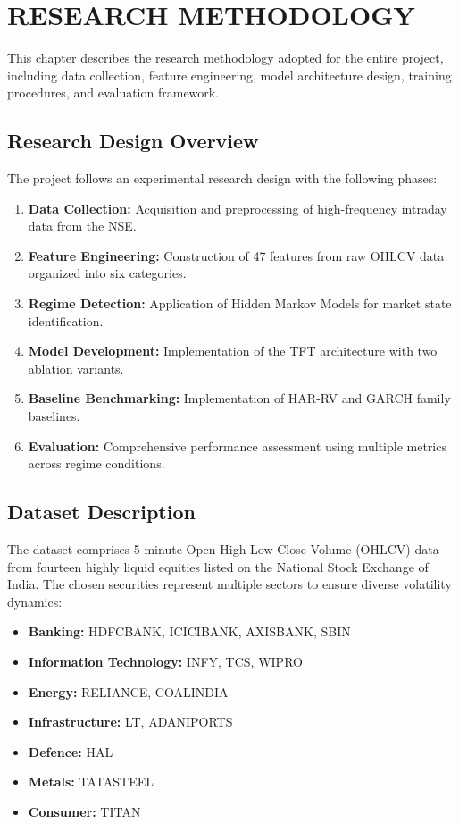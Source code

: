 \chapter{RESEARCH METHODOLOGY}
\label{ChapterResearchMethodology}

This chapter describes the research methodology adopted for the entire project, including data collection, feature engineering, model architecture design, training procedures, and evaluation framework.

\section{Research Design Overview}

The project follows an experimental research design with the following phases:

\begin{enumerate}
    \item \textbf{Data Collection:} Acquisition and preprocessing of high-frequency intraday data from the NSE.
    \item \textbf{Feature Engineering:} Construction of 47 features from raw OHLCV data organized into six categories.
    \item \textbf{Regime Detection:} Application of Hidden Markov Models for market state identification.
    \item \textbf{Model Development:} Implementation of the TFT architecture with two ablation variants.
    \item \textbf{Baseline Benchmarking:} Implementation of HAR-RV and GARCH family baselines.
    \item \textbf{Evaluation:} Comprehensive performance assessment using multiple metrics across regime conditions.
\end{enumerate}

\section{Dataset Description}

The dataset comprises 5-minute Open-High-Low-Close-Volume (OHLCV) data from fourteen highly liquid equities listed on the National Stock Exchange of India. The chosen securities represent multiple sectors to ensure diverse volatility dynamics:

\begin{itemize}
    \item \textbf{Banking:} HDFCBANK, ICICIBANK, AXISBANK, SBIN
    \item \textbf{Information Technology:} INFY, TCS, WIPRO
    \item \textbf{Energy:} RELIANCE, COALINDIA
    \item \textbf{Infrastructure:} LT, ADANIPORTS
    \item \textbf{Defence:} HAL
    \item \textbf{Metals:} TATASTEEL
    \item \textbf{Consumer:} TITAN
\end{itemize}

